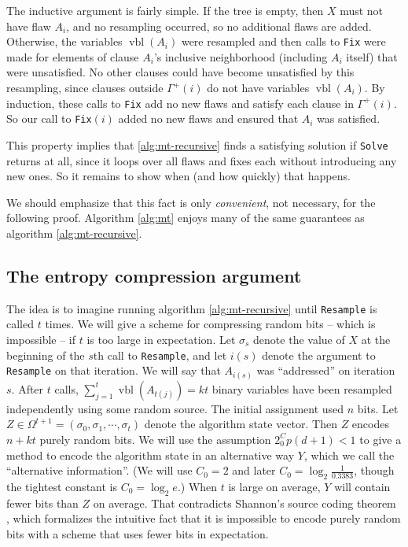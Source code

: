 \documentclass[twocolumn]{article}
\begin{document}
The inductive argument is fairly simple.  If the tree is empty, then $X$ must not have flaw $A_i$, and no resampling occurred, so no additional flaws are added.  Otherwise, the variables $\operatorname{vbl}(A_i)$ were resampled and then calls to \texttt{Fix} were made for elements of clause $A_i$'s inclusive neighborhood (including $A_i$ itself) that were unsatisfied.  No other clauses could have become unsatisfied by this resampling, since clauses outside $\Gamma^{+}(i)$ do not have variables $\operatorname{vbl}(A_i)$.  By induction, these calls to \texttt{Fix} add no new flaws and satisfy each clause in $\Gamma^{+}(i)$.  So our call to \texttt{Fix}$(i)$ added no new flaws and ensured that $A_i$ was satisfied.

This property implies that \ref{alg:mt-recursive} finds a satisfying solution if \texttt{Solve} returns at all, since it loops over all flaws and fixes each without introducing any new ones.  So it remains to show when (and how quickly) that happens.

We should emphasize that this fact is only \emph{convenient}, not necessary, for the following proof.  Algorithm \ref{alg:mt} enjoys many of the same guarantees as algorithm \ref{alg:mt-recursive}.

\subsection{The entropy compression argument}
The idea is to imagine running algorithm \ref{alg:mt-recursive} until \texttt{Resample} is called $t$ times.  We will give a scheme for compressing random bits -- which is impossible -- if $t$ is too large in expectation.  Let $\sigma_s$ denote the value of $X$ at the beginning of the $s$th call to \texttt{Resample}, and let $i(s)$ denote the argument to \texttt{Resample} on that iteration.  We will say that $A_{i(s)}$ was ``addressed'' on iteration $s$.  After $t$ calls, $\sum_{j = 1}^{t} \operatorname{vbl}(A_{t(j)}) = k t$ binary variables have been resampled independently using some random source.  The initial assignment used $n$ bits.  Let $Z \in \Omega^{t+1} = (\sigma_0, \sigma_1, \cdots, \sigma_t)$ denote the algorithm state vector.  Then $Z$ encodes $n + k t$ purely random bits.  We will use the assumption $2^C_0 p (d+1) < 1$ to give a method to encode the algorithm state in an alternative way $Y$, which we call the ``alternative information''.  (We will use $C_0 = 2$ and later $C_0 = \log_2 \frac{1}{0.3383}$, though the tightest constant is $C_0 = \log_2 e$.)  When $t$ is large on average, $Y$ will contain fewer bits than $Z$ on average.  That contradicts Shannon's source coding theorem \cite{shannon2001mathematical}, which formalizes the intuitive fact that it is impossible to encode purely random bits with a scheme that uses fewer bits in expectation.
\end{document}
